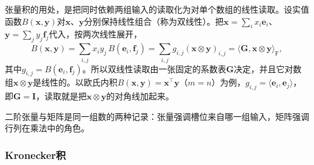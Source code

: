 张量积的用处，是把同时依赖两组输入的读取化为对单个数组的线性读取。设实值函数$B(\bm x,\bm y)$对$\bm x$、$\bm y$分别保持线性组合（称为双线性）。把$\bm x=\sum_ix_i\bm e_i$、$\bm y=\sum_jy_j\bm f_j$代入，按两次线性展开，
\[
 B(\bm x,\bm y)=\sum_{i,j}x_iy_j\,B(\bm e_i,\bm f_j)=\sum_{i,j}g_{i,j}(\bm x\otimes\bm y)_{i,j}
 =\langle\bm G,\bm x\otimes\bm y\rangle_{\mathrm F},
\]
其中$g_{i,j}=B(\bm e_i,\bm f_j)$。所以双线性读取由一张固定的系数表$\bm G$决定，并且它对数组$\bm x\otimes\bm y$是线性的。以欧氏内积$B(\bm x,\bm y)=\bm x^\top\bm y$（$m=n$）为例，$g_{i,j}=\langle\bm e_i,\bm e_j\rangle$，即$\bm G=\bm I$，读取就是把$\bm x\otimes\bm y$的对角线加起来。

二阶张量与矩阵是同一组数的两种记录：张量强调槽位来自哪一组输入，矩阵强调行列在乘法中的角色。

\subsubsection{Kronecker积}

